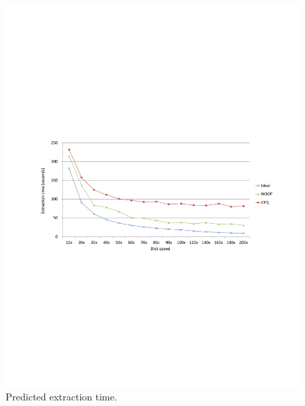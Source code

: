 \begin{figure}[htpb]
	\centering
	\includegraphics[trim=2cm 10cm 2cm 9.5cm, width=\textwidth]{figures/ch5-predicted-extraction-time.pdf}
	\caption{\label{fig:ch5-predicted-extraction-time}Predicted extraction time.}
\end{figure}

